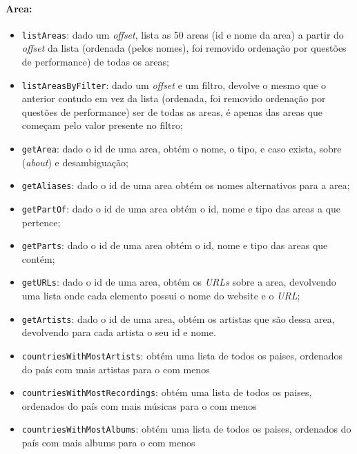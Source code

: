 \documentclass{article}
\begin{document}
\paragraph{\textbf{Area:}}
    \begin{itemize}
        \item \texttt{listAreas}: dado um \textit{offset}, lista as 50 areas (id e nome da area) a partir do \textit{offset} da lista (ordenada (pelos nomes), foi removido ordenação por questões de performance) de todas os areas;
        \item \texttt{listAreasByFilter}: dado um \textit{offset} e um filtro, devolve o mesmo que o anterior contudo em vez da lista (ordenada, foi removido ordenação por questões de performance) ser de todas as areas, é apenas das areas que começam pelo valor presente no filtro;
        \item \texttt{getArea}: dado o id de uma area, obtém o nome, o tipo, e caso exista, sobre (\textit{about}) e desambiguação;
        \item \texttt{getAliases}: dado o id de uma area obtém os nomes alternativos para a area;
        \item \texttt{getPartOf}: dado o id de uma area obtém o id, nome e tipo das areas a que pertence;
        \item \texttt{getParts}: dado o id de uma area obtém o id, nome e tipo das areas que contém;
        \item \texttt{getURLs}: dado o id de uma area, obtém os \textit{URLs} sobre a area, devolvendo uma lista onde cada elemento possui o nome do website e o \textit{URL};
        \item \texttt{getArtists}: dado o id de uma area, obtém os artistas que são dessa area, devolvendo para cada artista o seu id e nome.
        \item \texttt{countriesWithMostArtists}: obtém uma lista de todos os paises, ordenados do país com mais artistas para o com menos
        \item \texttt{countriesWithMostRecordings}: obtém uma lista de todos os paises, ordenados do país com mais músicas para o com menos
        \item \texttt{countriesWithMostAlbums}: obtém uma lista de todos os paises, ordenados do país com mais albums para o com menos
    \end{itemize}
\end{document}
